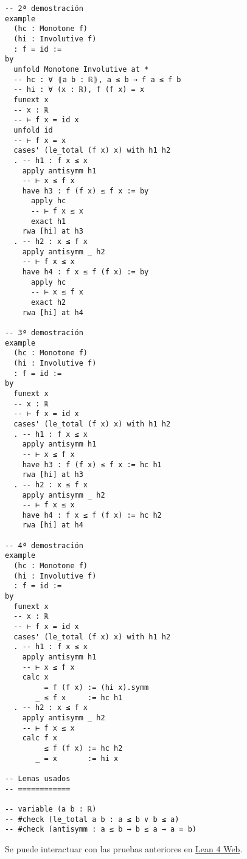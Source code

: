 \begin{verbatim}
-- 2ª demostración
example
  (hc : Monotone f)
  (hi : Involutive f)
  : f = id :=
by
  unfold Monotone Involutive at *
  -- hc : ∀ ⦃a b : ℝ⦄, a ≤ b → f a ≤ f b
  -- hi : ∀ (x : ℝ), f (f x) = x
  funext x
  -- x : ℝ
  -- ⊢ f x = id x
  unfold id
  -- ⊢ f x = x
  cases' (le_total (f x) x) with h1 h2
  . -- h1 : f x ≤ x
    apply antisymm h1
    -- ⊢ x ≤ f x
    have h3 : f (f x) ≤ f x := by
      apply hc
      -- ⊢ f x ≤ x
      exact h1
    rwa [hi] at h3
  . -- h2 : x ≤ f x
    apply antisymm _ h2
    -- ⊢ f x ≤ x
    have h4 : f x ≤ f (f x) := by
      apply hc
      -- ⊢ x ≤ f x
      exact h2
    rwa [hi] at h4

-- 3ª demostración
example
  (hc : Monotone f)
  (hi : Involutive f)
  : f = id :=
by
  funext x
  -- x : ℝ
  -- ⊢ f x = id x
  cases' (le_total (f x) x) with h1 h2
  . -- h1 : f x ≤ x
    apply antisymm h1
    -- ⊢ x ≤ f x
    have h3 : f (f x) ≤ f x := hc h1
    rwa [hi] at h3
  . -- h2 : x ≤ f x
    apply antisymm _ h2
    -- ⊢ f x ≤ x
    have h4 : f x ≤ f (f x) := hc h2
    rwa [hi] at h4

-- 4ª demostración
example
  (hc : Monotone f)
  (hi : Involutive f)
  : f = id :=
by
  funext x
  -- x : ℝ
  -- ⊢ f x = id x
  cases' (le_total (f x) x) with h1 h2
  . -- h1 : f x ≤ x
    apply antisymm h1
    -- ⊢ x ≤ f x
    calc x
         = f (f x) := (hi x).symm
       _ ≤ f x     := hc h1
  . -- h2 : x ≤ f x
    apply antisymm _ h2
    -- ⊢ f x ≤ x
    calc f x
         ≤ f (f x) := hc h2
       _ = x       := hi x

-- Lemas usados
-- ============

-- variable (a b : ℝ)
-- #check (le_total a b : a ≤ b ∨ b ≤ a)
-- #check (antisymm : a ≤ b → b ≤ a → a = b)
\end{verbatim}
Se puede interactuar con las pruebas anteriores en \href{https://lean.math.hhu.de/\#url=https://raw.githubusercontent.com/jaalonso/Calculemus2/main/src/Una\_funcion\_creciente\_e\_involutiva\_es\_la\_identidad.lean}{Lean 4 Web}.

